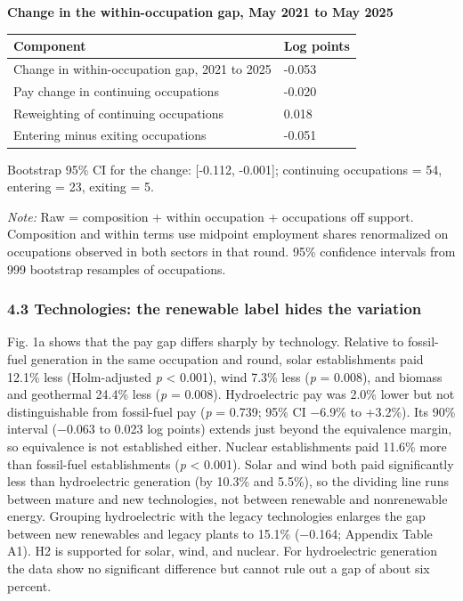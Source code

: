 \documentclass[
  11pt,
]{article}
\newcounter{none} %
\begin{document}
\textbf{Change in the within-occupation gap, May 2021 to May 2025}

{\def\LTcaptype{none} %
\begin{longtable}[]{@{}ll@{}}
\toprule\noalign{}
Component & Log points \\
\midrule\noalign{}
\endhead
\bottomrule\noalign{}
\endlastfoot
Change in within-occupation gap, 2021 to 2025 & -0.053 \\
Pay change in continuing occupations & -0.020 \\
Reweighting of continuing occupations & 0.018 \\
Entering minus exiting occupations & -0.051 \\
\end{longtable}
}

Bootstrap 95\% CI for the change: {[}-0.112, -0.001{]}; continuing
occupations = 54, entering = 23, exiting = 5.

\emph{Note:} Raw = composition + within occupation + occupations off
support. Composition and within terms use midpoint employment shares
renormalized on occupations observed in both sectors in that round. 95\%
confidence intervals from 999 bootstrap resamples of occupations.

\subsubsection{4.3 Technologies: the renewable label hides the
variation}\label{technologies-the-renewable-label-hides-the-variation}

Fig. 1a shows that the pay gap differs sharply by technology. Relative
to fossil-fuel generation in the same occupation and round, solar
establishments paid 12.1\% less (Holm-adjusted \emph{p} \textless{}
0.001), wind 7.3\% less (\emph{p} = 0.008), and biomass and geothermal
24.4\% less (\emph{p} = 0.008). Hydroelectric pay was 2.0\% lower but
not distinguishable from fossil-fuel pay (\emph{p} = 0.739; 95\% CI
−6.9\% to +3.2\%). Its 90\% interval (−0.063 to 0.023 log points)
extends just beyond the equivalence margin, so equivalence is not
established either. Nuclear establishments paid 11.6\% more than
fossil-fuel establishments (\emph{p} \textless{} 0.001). Solar and wind
both paid significantly less than hydroelectric generation (by 10.3\%
and 5.5\%), so the dividing line runs between mature and new
technologies, not between renewable and nonrenewable energy. Grouping
hydroelectric with the legacy technologies enlarges the gap between new
renewables and legacy plants to 15.1\% (−0.164; Appendix Table A1). H2
is supported for solar, wind, and nuclear. For hydroelectric generation
the data show no significant difference but cannot rule out a gap of
about six percent.
\end{document}
